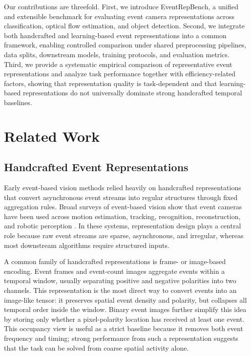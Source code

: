 \documentclass[letterpaper]{article}
\begin{document}
Our contributions are threefold. First, we introduce EventRepBench, a unified and extensible benchmark for evaluating event camera representations across classification, optical flow estimation, and object detection. Second, we integrate both handcrafted and learning-based event representations into a common framework, enabling controlled comparison under shared preprocessing pipelines, data splits, downstream models, training protocols, and evaluation metrics. Third, we provide a systematic empirical comparison of representative event representations and analyze task performance together with efficiency-related factors, showing that representation quality is task-dependent and that learning-based representations do not universally dominate strong handcrafted temporal baselines.

\section{Related Work}
\subsection{Handcrafted Event Representations}
Early event-based vision methods relied heavily on handcrafted representations that convert asynchronous event streams into regular structures through fixed aggregation rules. Broad surveys of event-based vision show that event cameras have been used across motion estimation, tracking, recognition, reconstruction, and robotic perception \cite{xu2025reconstruction}. In these systems, representation design plays a central role because raw event streams are sparse, asynchronous, and irregular, whereas most downstream algorithms require structured inputs.

A common family of handcrafted representations is frame- or image-based encoding. Event frames and event-count images aggregate events within a temporal window, usually separating positive and negative polarities into two channels. This representation is the most direct way to convert events into an image-like tensor: it preserves spatial event density and polarity, but collapses all temporal order inside the window. Binary event images further simplify this idea by storing only whether a pixel-polarity location has received at least one event. This occupancy view is useful as a strict baseline because it removes both event frequency and timing; strong performance from such a representation suggests that the task can be solved from coarse spatial activity alone.
\end{document}
